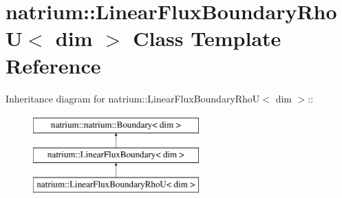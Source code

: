 \hypertarget{classnatrium_1_1LinearFluxBoundaryRhoU}{
\section{natrium::LinearFluxBoundaryRhoU$<$ dim $>$ Class Template Reference}
\label{classnatrium_1_1LinearFluxBoundaryRhoU}
}
Inheritance diagram for natrium::LinearFluxBoundaryRhoU$<$ dim $>$::\begin{figure}[H]
\begin{center}
\leavevmode
\includegraphics[height=3cm]{classnatrium_1_1LinearFluxBoundaryRhoU}
\end{center}
\end{figure}
